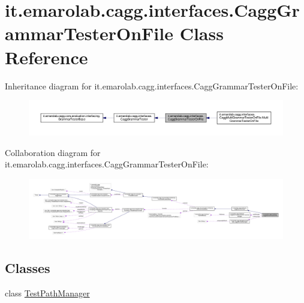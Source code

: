 \hypertarget{classit_1_1emarolab_1_1cagg_1_1interfaces_1_1CaggGrammarTesterOnFile}{\section{it.\-emarolab.\-cagg.\-interfaces.\-Cagg\-Grammar\-Tester\-On\-File Class Reference}
\label{classit_1_1emarolab_1_1cagg_1_1interfaces_1_1CaggGrammarTesterOnFile}
}


Inheritance diagram for it.\-emarolab.\-cagg.\-interfaces.\-Cagg\-Grammar\-Tester\-On\-File\-:\nopagebreak
\begin{figure}[H]
\begin{center}
\leavevmode
\includegraphics[width=350pt]{classit_1_1emarolab_1_1cagg_1_1interfaces_1_1CaggGrammarTesterOnFile__inherit__graph}
\end{center}
\end{figure}


Collaboration diagram for it.\-emarolab.\-cagg.\-interfaces.\-Cagg\-Grammar\-Tester\-On\-File\-:\nopagebreak
\begin{figure}[H]
\begin{center}
\leavevmode
\includegraphics[width=350pt]{classit_1_1emarolab_1_1cagg_1_1interfaces_1_1CaggGrammarTesterOnFile__coll__graph}
\end{center}
\end{figure}
\subsection*{Classes}
\begin{DoxyCompactItemize}
\item 
class \hyperlink{classit_1_1emarolab_1_1cagg_1_1interfaces_1_1CaggGrammarTesterOnFile_1_1TestPathManager}{Test\-Path\-Manager}
\end{DoxyCompactItemize}
